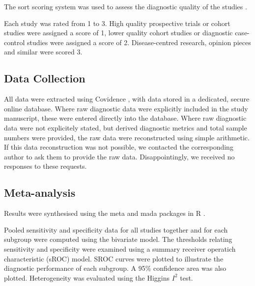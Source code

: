
The \gls{sort}  scoring system was used to assess the diagnostic quality of the studies \cite{ebellStrengthRecommendationTaxonomy2004}.

Each study was rated from 1 to 3. 
High quality prospective trials or cohort studies were assigned a score of 1, lower quality cohort studies or diagnostic case-control studies were assigned a score of 2. 
Disease-centred research, opinion pieces and similar were scored 3.

\subsection{Data Collection}

All data were extracted using Covidence \cite{Covidence}, with data stored in a dedicated, secure online database.
Where raw diagnostic data were explicitly included in the study manuscript, these were entered directly into the database.
Where raw diagnostic data were not explicitely stated, but derived diagnostic metrics and total sample numbers were provided, the raw data were reconstructed using simple arithmetic.
If this data reconstruction was not possible, we contacted the corresponding author to ask them to provide the raw data. 
Disappointingly, we received no responses to these requests.




\subsection{Meta-analysis}

Results were synthesised using the meta \cite{balduzziHowPerformMetaanalysis2019} and mada \cite{doeblerMadaMetaAnalysisDiagnostic2020} packages in R \cite{r-core}. 

Pooled sensitivity and specificity data for all studies together and for each subgroup were computed using the bivariate model.
The thresholds relating sensitivity and specificity were examined using a summary receiver operatich characteristic (sROC) model.
SROC curves were plotted to illustrate the diagnostic performance of each subgroup.
A 95\% confidence area was also plotted.
Heterogeneity was evaluated using the Higgins $I^2$ test\cite{higginsQuantifyingHeterogeneityMetaanalysis2002}.
